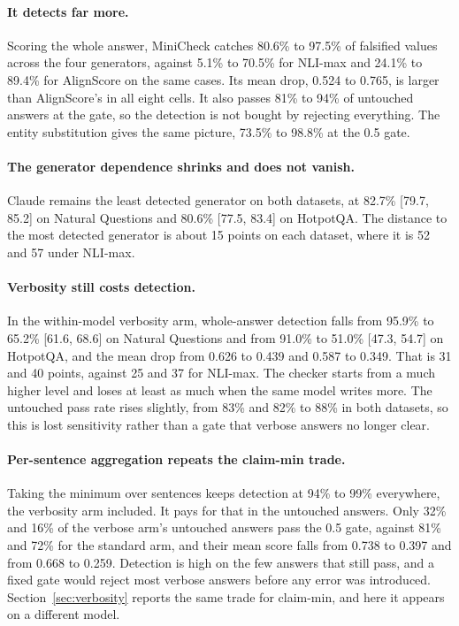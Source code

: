 \documentclass[11pt]{article}
\begin{document}
\paragraph{It detects far more.} Scoring the whole answer, MiniCheck catches 80.6\% to 97.5\% of falsified values across the four generators, against 5.1\% to 70.5\% for NLI-max and 24.1\% to 89.4\% for AlignScore on the same cases. Its mean drop, 0.524 to 0.765, is larger than AlignScore's in all eight cells. It also passes 81\% to 94\% of untouched answers at the gate, so the detection is not bought by rejecting everything. The entity substitution gives the same picture, 73.5\% to 98.8\% at the 0.5 gate.

\paragraph{The generator dependence shrinks and does not vanish.} Claude remains the least detected generator on both datasets, at 82.7\% [79.7, 85.2] on Natural Questions and 80.6\% [77.5, 83.4] on HotpotQA. The distance to the most detected generator is about 15 points on each dataset, where it is 52 and 57 under NLI-max.

\paragraph{Verbosity still costs detection.} In the within-model verbosity arm, whole-answer detection falls from 95.9\% to 65.2\% [61.6, 68.6] on Natural Questions and from 91.0\% to 51.0\% [47.3, 54.7] on HotpotQA, and the mean drop from 0.626 to 0.439 and 0.587 to 0.349. That is 31 and 40 points, against 25 and 37 for NLI-max. The checker starts from a much higher level and loses at least as much when the same model writes more. The untouched pass rate rises slightly, from 83\% and 82\% to 88\% in both datasets, so this is lost sensitivity rather than a gate that verbose answers no longer clear.

\paragraph{Per-sentence aggregation repeats the claim-min trade.} Taking the minimum over sentences keeps detection at 94\% to 99\% everywhere, the verbosity arm included. It pays for that in the untouched answers. Only 32\% and 16\% of the verbose arm's untouched answers pass the 0.5 gate, against 81\% and 72\% for the standard arm, and their mean score falls from 0.738 to 0.397 and from 0.668 to 0.259. Detection is high on the few answers that still pass, and a fixed gate would reject most verbose answers before any error was introduced. Section~\ref{sec:verbosity} reports the same trade for claim-min, and here it appears on a different model.
\end{document}
